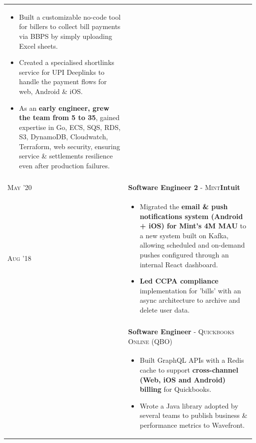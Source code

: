 \documentclass[a4paper,10pt]{extarticle} %
\begin{document}
\begin{tabularx}{\linewidth}{l | X}
\begin{itemize}[leftmargin=*, nosep, before=\vspace{-1.0\baselineskip}, after=\vspace{-1.0\baselineskip}]
  \item Built a customizable no-code tool for billers to collect bill payments via BBPS by simply uploading Excel sheets.
  \item Created a specialised shortlinks service for UPI Deeplinks to handle the payment flows for web, Android \& iOS.
  \item As an \textbf{early engineer, grew the team from 5 to 35}, gained expertise in Go, ECS, SQS, RDS, S3, DynamoDB, Cloudwatch, Terraform, web security, ensuring service \& settlements resilience even after production failures.
\end{itemize}\\
\multicolumn{2}{c}{} \\

\textsc{May '20} & \textbf{Software Engineer 2} \textsc{- Mint}\hfill\raisebox{-.1\height}{ \hspace{0.3em}}\textbf{Intuit}\\
\textsc{Aug '18} & \begin{itemize}[leftmargin=*, nosep, before=\vspace{-1.0\baselineskip}, after=\vspace{-1.6\baselineskip}]
  \item Migrated the \textbf{email \& push notifications system (Android + iOS) for Mint's 4M MAU} to a new system built on Kafka, allowing scheduled and on-demand pushes configured through an internal React dashboard.
  \item \textbf{Led CCPA compliance} implementation for 'bills' with an async architecture to archive and delete user data.
\end{itemize}\\\\
& \textbf{Software Engineer} \textsc{- Quickbooks Online (QBO)}\\
& \begin{itemize}[leftmargin=*, nosep, before=\vspace{-1.0\baselineskip}, after=\vspace{-1.6\baselineskip}]
  \item Built GraphQL APIs with a Redis cache to support \textbf{cross-channel (Web, iOS and Android) billing} for Quickbooks.
  \item Wrote a Java library adopted by several teams to publish business \& performance metrics to Wavefront.

\end{itemize}
\end{tabularx}
\end{document}
